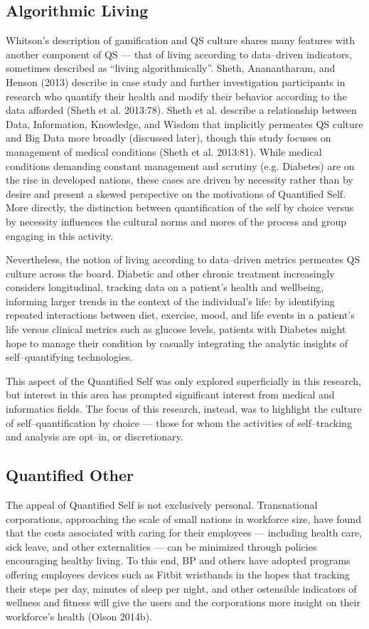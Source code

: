 \documentclass{article}
\begin{document}
\subsection*{Algorithmic Living}
Whitson's description of gamification and QS culture shares many features with another component of QS
--- that of living according to data--driven indicators,
sometimes described as ``living algorithmically''.
Sheth,
Ananantharam,
and Henson (2013) describe in case study and further investigation participants in research who quantify their health and modify their behavior according to the data afforded
(Sheth et al. 2013:78).
Sheth et al.
describe a relationship between Data,
Information,
Knowledge,
and Wisdom that implicitly permeates QS culture and Big Data more broadly (discussed later),
though this study focuses on management of medical conditions
(Sheth et al. 2013:81).
While medical conditions demanding constant management and scrutiny (e.g.
Diabetes) are on the rise in developed nations,
these cases are driven by necessity rather than by desire and present a skewed perspective on the motivations of Quantified Self.
More directly,
the distinction between quantification of the self by choice versus by necessity influences the cultural norms and mores of the process and group engaging in this activity.

Nevertheless,
the notion of living according to data--driven metrics permeates QS culture across the board.
Diabetic and other chronic treatment increasingly considers longitudinal,
tracking data on a patient's health and wellbeing,
informing larger trends in the context of the individual's life:
by identifying repeated interactions between diet,
exercise,
mood,
and life events in a patient's life versus clinical metrics such as glucose levels,
patients with Diabetes might hope to manage their condition by casually integrating the analytic insights of self--quantifying technologies.

This aspect of the Quantified Self was only explored superficially in this research,
but interest in this area has prompted significant interest from medical and informatics fields.
The focus of this research,
instead,
was to highlight the culture of self--quantification by choice
--- those for whom the activities of self--tracking and analysis are opt--in,
or discretionary.

\subsection*{Quantified Other}
The appeal of Quantified Self is not exclusively personal.
Transnational corporations,
approaching the scale of small nations in workforce size,
have found that the costs associated with caring for their employees
--- including health care,
sick leave,
and other externalities
--- can be minimized through policies encouraging healthy living.
To this end,
BP and others have adopted programs offering employees devices such as Fitbit wristbands in the hopes that tracking their steps per day,
minutes of sleep per night,
and other ostensible indicators of wellness and fitness will give the users and the corporations more insight on their workforce's health
(Olson 2014b).
\end{document}
